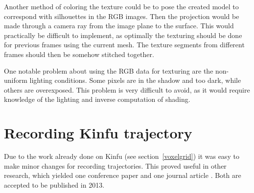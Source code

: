 Another method of coloring the texture could be to pose the created model to correspond with silhouettes in the RGB images. Then the projection would be made through a camera ray from the image plane to the surface. This would practically be difficult to implement, as optimally the texturing should be done for previous frames using the current mesh. The texture segments from different frames should then be somehow stitched together.

One notable problem about using the RGB data for texturing are the non-uniform lighting conditions. Some pixels are in the shadow and too dark, while others are overexposed. This problem is very difficult to avoid, as it would require knowledge of the lighting and inverse computation of shading.

\section{Recording Kinfu trajectory}


Due to the work already done on Kinfu (see section~\ref{voxelgrid}) it was easy to make minor changes for recording trajectories. This proved useful in other research, which yielded one conference paper \citep*{tykkalavisapp} and one journal article \citep*{tykkalavcir}. Both are accepted to be published in 2013.
